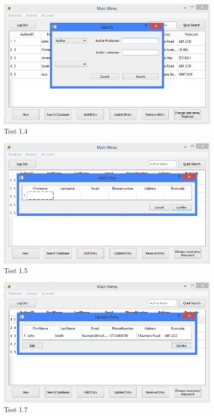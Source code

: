 \begin{landscape}
\begin{figure}[H]
    \includegraphics[width=\textwidth]{./Testing/Evidence/SearchDatabaseButtonTest.png}
    \caption{Test 1.4}  \label{fig:SearchDatabaseButtonTest}
\end{figure}

\begin{figure}[H]
    \includegraphics[width=\textwidth]{./Testing/Evidence/AddEntryButtonTest.png}
    \caption{Test 1.5}  \label{fig:AddEntryButtonTest}
\end{figure}

\begin{figure}[H]
    \includegraphics[width=\textwidth]{./Testing/Evidence/UpdateEntryButtonTest.png}
    \caption{Test 1.7}  \label{fig:UpdateEntryButtonTest}
\end{figure}


\end{landscape}
